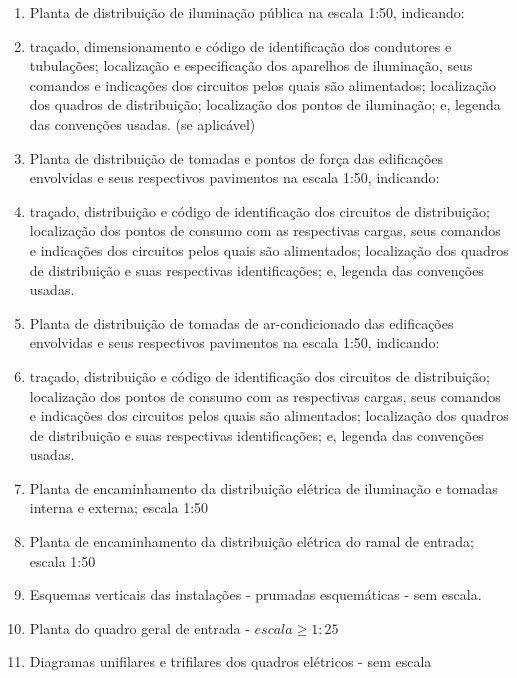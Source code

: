\begin{enumerate}
	\item Planta de distribuição de iluminação pública na escala 1:50,  indicando: 

	\item traçado, dimensionamento e código de identificação dos condutores e tubulações; localização e especificação dos aparelhos de iluminação, seus comandos e indicações dos circuitos pelos quais são alimentados; localização dos quadros de distribuição; localização dos pontos de iluminação; e, legenda das convenções usadas. (se aplicável)

	\item Planta de distribuição de tomadas e pontos de força das edificações envolvidas e seus respectivos pavimentos na escala 1:50, indicando: 

	\item traçado, distribuição e código de identificação dos circuitos de distribuição; localização dos pontos de consumo com as respectivas cargas, seus comandos e indicações dos circuitos pelos quais são alimentados; localização dos quadros de distribuição e suas respectivas identificações; e, legenda das convenções usadas.

	\item Planta de distribuição de tomadas de ar-condicionado das edificações envolvidas e seus respectivos pavimentos na escala 1:50, indicando: 

	\item traçado, distribuição e código de identificação dos circuitos de distribuição; localização dos pontos de consumo com as respectivas cargas, seus comandos e indicações dos circuitos pelos quais são alimentados; localização dos quadros de distribuição e suas respectivas identificações; e, legenda das convenções usadas.

	\item Planta de encaminhamento da distribuição elétrica de iluminação e tomadas interna e externa; escala 1:50

	\item Planta de encaminhamento da distribuição elétrica do ramal de entrada; escala 1:50

	\item Esquemas verticais das instalações - prumadas esquemáticas - sem escala.

	\item Planta do quadro geral de entrada - $escala \geq 1:25$

	\item Diagramas unifilares e trifilares dos quadros elétricos - sem escala 


\end{enumerate}
